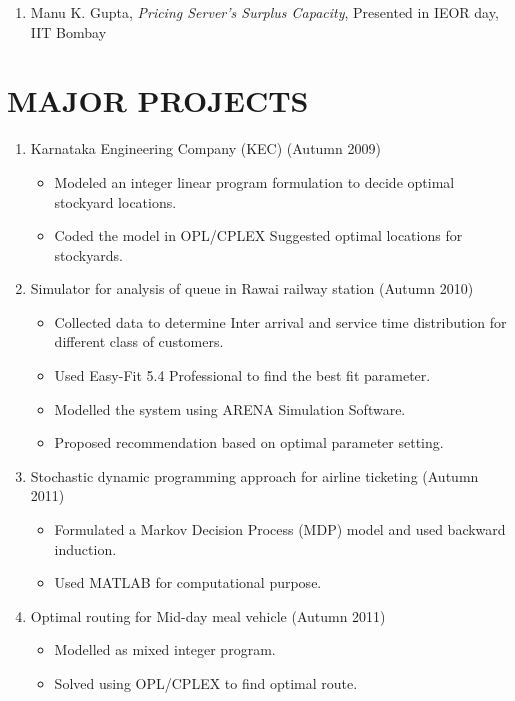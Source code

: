\documentclass[line,margin]{res}
\begin{document}
\begin{resume}
{\begin{enumerate}
\item Manu K. Gupta, \textit{Pricing Server's Surplus Capacity}, Presented in IEOR day, IIT Bombay


\end{enumerate}}

\section{MAJOR
PROJECTS} \begin{enumerate}
\item Karnataka Engineering Company (KEC) (Autumn 2009)
{\footnotesize\begin{itemize}
\item Modeled an integer linear program formulation to decide optimal stockyard locations.
\item Coded the model in OPL/CPLEX Suggested optimal locations for stockyards.
\end{itemize}}
\item Simulator for analysis of queue in Rawai railway station (Autumn 2010)
{\footnotesize\begin{itemize}
\item Collected data to determine Inter arrival and service time distribution for different class of
customers.
\item Used Easy-Fit 5.4 Professional to find the best fit parameter.
\item Modelled the system using ARENA Simulation Software.
\item Proposed recommendation based on optimal parameter setting.
\end{itemize}}
\item Stochastic dynamic programming approach for airline ticketing (Autumn
2011)
{\footnotesize\begin{itemize}
\item Formulated a Markov Decision Process (MDP) model and used backward induction.
\item Used MATLAB for computational purpose.
\end{itemize}}
\item Optimal routing for Mid-day meal vehicle (Autumn 2011)
{\footnotesize\begin{itemize}
\item Modelled as mixed integer program.
\item Solved using OPL/CPLEX to find optimal route.
\end{itemize}}
\end{enumerate}


\end{resume}
\end{document}
